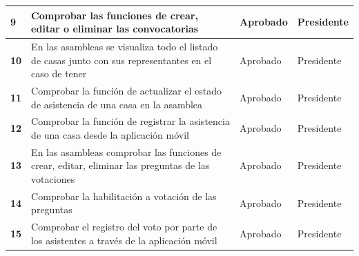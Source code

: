 \begin{footnotesize}
\begin{spacing}{1}
\begin{center}
\begin{longtable}{ |>{\bfseries}l|p{}|l|l| }
        \hline
        9 & Comprobar las funciones de crear, editar o eliminar las convocatorias & Aprobado & Presidente\\
        \hline
        10 & En las asambleas se visualiza todo el listado de casas junto con sus representantes en el caso de tener & Aprobado & Presidente\\
        \hline
        11 & Comprobar la función de actualizar el estado de asistencia de una casa en la asamblea & Aprobado & Presidente\\
        \hline
        12 & Comprobar la función de registrar la asistencia de una casa desde la aplicación móvil & Aprobado & Presidente\\
        \hline
        13 & En las asambleas comprobar las funciones de crear, editar, eliminar las preguntas de las votaciones & Aprobado & Presidente\\
        \hline
        14 & Comprobar la habilitación a votación de las preguntas & Aprobado & Presidente\\
        \hline
        15 & Comprobar el registro del voto por parte de los asistentes a través de la aplicación móvil & Aprobado & Presidente\\
        \hline
    \end{longtable}\label{tab:pruebas-aceptacion-2}
    \end{center}
\end{spacing}
\end{footnotesize}


